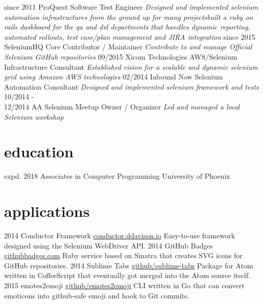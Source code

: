 \documentclass[]{ddavison-resume}
\begin{document}
\begin{entrylist}
  \entry
  	{since 2011}
  	{ProQuest}
  	{Software Test Engineer}
  	{\emph{Designed and implemented selenium automation infrastructures from the ground up for many projects\bullet built a ruby on rails dashboard for the qa and dvl departments that handles dynamic reporting, automated rollouts, test case/plan management and JIRA integration}} 
  \entry
  	{since 2015}
  	{SeleniumHQ}
  	{Core Contributor / Maintainer}
  	{\emph{Contribute to and manage Official Selenium GitHub repositories}}
  \entry
  	{09/2015}
  	{Xicom Technologies}
  	{AWS/Selenium Infrastructure Consultant}
  	{\emph{Established vision for a scalable and dynamic selenium grid using Amazon AWS technologies}}
  \entry
  	{02/2014}
  	{Inbound Now}
  	{Selenium Automation Consultant}
  	{\emph{Designed and implemented selenium framework and tests}}
  \entry
  	{10/2014 - \\
  	12/2014}
  	{AA Selenium Meetup}
  	{Owner / Organizer}
  	{\emph{Led and managed a local Selenium workshop}}
\end{entrylist}

\section{education}

\begin{entrylist}
  \entry
    {expd. 2018}
    {Associates {\normalfont in Computer Programming}}
    {University of Phoenix}
    {}
\end{entrylist}

\section{applications}

\begin{entrylist}
  \entry
    {2014}
    {Conductor Framework}
    {\href{https://conductor.ddavison.io}{conductor.ddavison.io}}
    {Easy-to-use framework designed using the Selenium WebDriver API.}
  \entry
    {2014}
    {GitHub Badges}
    {\href{https://github.com/ddavison/github-badges}{githubbadges.com}}
    {Ruby service based on Sinatra that creates SVG icons for GitHub repositories.}
  \entry
    {2014}
    {Sublime Tabs}
    {\href{https://github.com/ddavison/sublime-tabs}{github/sublime-tabs}}
    {Package for Atom written in CoffeeScript that eventually got merged into the Atom source itself.}
  \entry
  	{2015}
  	{emotes2emoji}
  	{\href{https://github.com/ddavison/emotes2emoji}{github/emotes2emoji}}
  	{CLI written in Go that can convert emoticons  into github-safe emoji and hook to Git commits.}
\end{entrylist}
\end{document}
